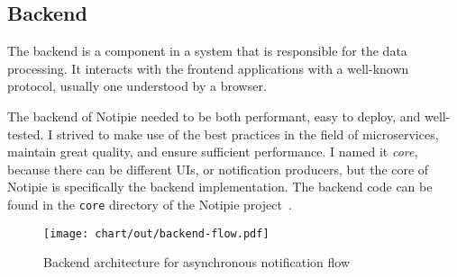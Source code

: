 \subsection{Backend}\label{sec:backend}

The backend is a component in a system
that is responsible for the data processing.
It interacts with the frontend applications
with a well-known protocol,
usually one understood by a browser.

The backend of Notipie
needed to be both performant,
easy to deploy,
and well-tested.
I strived to make use of the best practices
in the field of microservices,
maintain great quality,
and ensure sufficient performance.
I named it \textit{core},
because there can be different \acp{UI},
or notification producers,
but the core of Notipie
is specifically the backend implementation.
The backend code can be found in the
\texttt{core} directory of the Notipie project~\cite{sewera_notipie_2022}.

\begin{figure}[!ht]
  \centering
  \texttt{[image: chart/out/backend-flow.pdf]}
  \caption{Backend architecture for asynchronous notification flow}
  \label{fig:high-level-backend-flow}
\end{figure}




